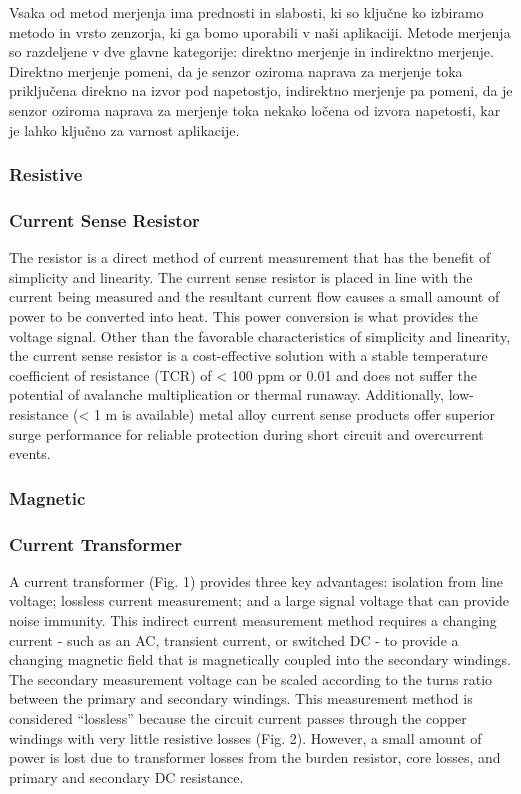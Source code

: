 \documentclass[12pt,a4paper,titlepage,openany]{report}
\begin{document}
Vsaka od metod merjenja ima prednosti in slabosti, ki so ključne ko izbiramo metodo in vrsto zenzorja, ki ga bomo uporabili
v naši aplikaciji. Metode merjenja so razdeljene v dve glavne kategorije: direktno merjenje in indirektno merjenje.
Direktno merjenje pomeni, da je senzor oziroma naprava za merjenje toka priključena direkno na izvor pod napetostjo, 
indirektno merjenje pa pomeni, da je senzor oziroma naprava za merjenje toka nekako ločena od izvora napetosti, 
kar je lahko ključno za varnost aplikacije.

\subsubsection{Resistive}
\subsubsection{Current Sense Resistor}
The resistor is a direct method of current measurement that has the benefit of simplicity and linearity. The current sense resistor
is placed in line with the current being measured and the resultant current flow causes a small amount of power to be converted
into heat. This power conversion is what provides the voltage signal. Other than the favorable characteristics of simplicity and
linearity, the current sense resistor is a cost-effective solution with a stable temperature coefficient of resistance (TCR) of
< 100 ppm or 0.01  and does not suffer the potential of avalanche multiplication or thermal runaway. Additionally,
low-resistance (< 1 m is available) metal alloy current sense products offer superior surge performance for reliable protection
during short circuit and overcurrent events.

\subsubsection{Magnetic}
\subsubsection{Current Transformer}
A current transformer (Fig. 1) provides three key advantages: isolation from line voltage; lossless current measurement; and a
large signal voltage that can provide noise immunity. This indirect current measurement method requires a changing current -
such as an AC, transient current, or switched DC - to provide a changing magnetic field that is magnetically coupled into the
secondary windings. The secondary measurement voltage can be scaled according to the turns ratio between the primary and
secondary windings. This measurement method is considered “lossless” because the circuit current passes through the copper
windings with very little resistive losses (Fig. 2). However, a small amount of power is lost due to transformer losses from the
burden resistor, core losses, and primary and secondary DC resistance.
\end{document}
